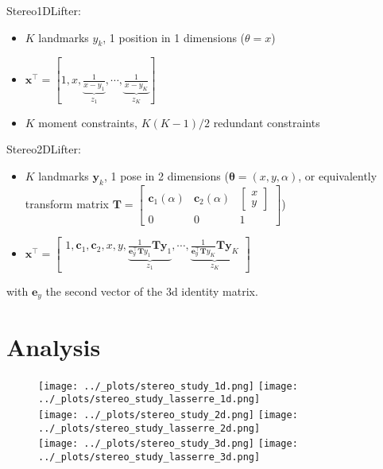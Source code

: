 \documentclass[11pt]{article}
\providecommand{\tightlist}{%
  \setlength{\itemsep}{0pt}\setlength{\parskip}{0pt}}
\begin{document}
Stereo1DLifter:

\begin{itemize}
\tightlist
\item \(K\) landmarks \(y_k\), 1 position in 1 dimensions (\(\theta=x\))
\item \(\mathbf{x}^\top = [1, x, \underbrace{\frac{1}{x-y_1}}_{z_1}, \cdots, \underbrace{\frac{1}{x-y_K}}_{z_K}]\) 
\item \(K\) moment constraints, \(K(K-1)/2\) redundant constraints
\end{itemize}

Stereo2DLifter:

\begin{itemize}
\tightlist
\item \(K\) landmarks \(\mathbf{y}_k\), 1 pose in 2 dimensions (\(\mathbf{\theta}=(x, y, \alpha)\), or equivalently transform matrix \(\mathbf{T}=\begin{bmatrix} \mathbf{c}_1(\alpha) & \mathbf{c}_2(\alpha) & \begin{bmatrix} x \\ y \end{bmatrix} \\ 0 & 0 & 1 \end{bmatrix}\))
\item \(\mathbf{x}^\top = \begin{bmatrix} 1, \mathbf{c}_1, \mathbf{c}_2, x, y, \underbrace{\frac{1}{\mathbf{e}_y^\top\mathbf{T}{y}_1}\mathbf{T}\mathbf{y}_1}_{z_1}, \cdots, \underbrace{\frac{1}{\mathbf{e}_y^\top\mathbf{T}{y}_K}\mathbf{T}\mathbf{y}_K}_{z_K}\end{bmatrix}\)
\end{itemize}

with \(\mathbf{e}_y\) the second vector of the 3d identity matrix.

\newpage
\FloatBarrier
\section{Analysis}

\begin{figure}[h]
  \centering
  \texttt{[image: ../\_plots/stereo\_study\_1d.png]}
  \texttt{[image: ../\_plots/stereo\_study\_lasserre\_1d.png]} \\
  \texttt{[image: ../\_plots/stereo\_study\_2d.png]}
  \texttt{[image: ../\_plots/stereo\_study\_lasserre\_2d.png]} \\
  \texttt{[image: ../\_plots/stereo\_study\_3d.png]}
  \texttt{[image: ../\_plots/stereo\_study\_lasserre\_3d.png]}
  \label{fig:noise}
\end{figure}
\end{document}
